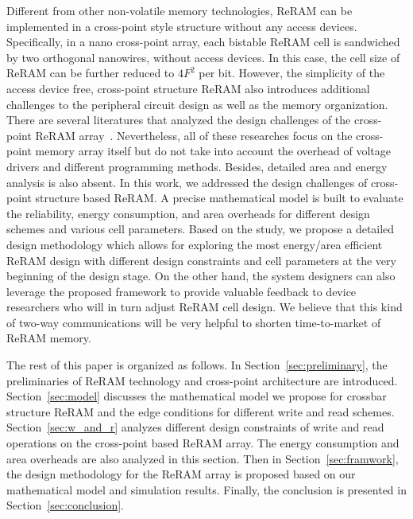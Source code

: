 Different from other non-volatile memory technologies, ReRAM can be implemented in a cross-point style structure without any access devices. Specifically, in a nano cross-point array, each bistable ReRAM cell is sandwiched by two orthogonal nanowires, without access devices. In this case, the cell size of ReRAM can be further reduced to $4F^2$ per bit. However, the simplicity of the access device free, cross-point structure ReRAM also introduces additional challenges to the peripheral circuit design as well as the memory organization. There are several literatures that analyzed the design challenges of the cross-point ReRAM array~\cite{crossbar_NANO2002_Ziegler,crossbar_NANO08_Flocke,crossbar_TED_2010,crossbar_NANO2003_Ziegler}. Nevertheless, all of these researches focus on the cross-point memory array itself but do not take into account the overhead of voltage drivers and different programming methods. Besides, detailed area and energy analysis is also absent. In this work, we addressed the design challenges of cross-point structure based ReRAM. A precise mathematical model is built to evaluate the reliability, energy consumption, and area overheads for different design schemes and various cell parameters. Based on the study, we propose a detailed design methodology which allows for exploring the most energy/area efficient ReRAM design with different design constraints and cell parameters at the very beginning of the design stage. On the other hand, the system designers can also leverage the proposed framework to provide valuable feedback to device researchers who will in turn adjust ReRAM cell design. We believe that this kind of two-way communications will be very helpful to shorten time-to-market of ReRAM memory.

The rest of this paper is organized as follows. In
Section~\ref{sec:preliminary}, the preliminaries of ReRAM technology and cross-point architecture are introduced. Section~\ref{sec:model} discusses the mathematical model we propose for crossbar structure ReRAM and the edge conditions for different write and read schemes. Section~\ref{sec:w_and_r} analyzes different design constraints of write and read operations on the cross-point based ReRAM array. The energy consumption and area overheads are also analyzed in this section. Then in Section~\ref{sec:framwork}, the design methodology for the ReRAM array is proposed based on our mathematical model and simulation results. Finally, the conclusion is presented in Section~\ref{sec:conclusion}. 